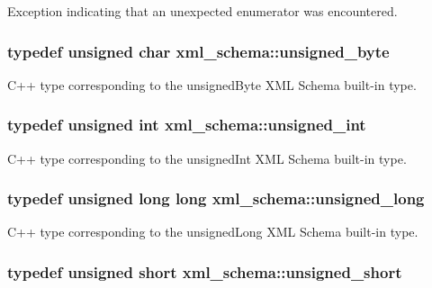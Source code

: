 Exception indicating that an unexpected enumerator was encountered. 

\hypertarget{namespacexml__schema_a876b68656d976c6343512f3d44fe8ca2}{
\subsubsection[{unsigned\-\_\-byte}]{\setlength{\rightskip}{0pt plus 5cm}typedef unsigned char {\bf xml\-\_\-schema\-::unsigned\-\_\-byte}}}\label{namespacexml__schema_a876b68656d976c6343512f3d44fe8ca2}


C++ type corresponding to the unsigned\-Byte X\-M\-L Schema built-\/in type. 

\hypertarget{namespacexml__schema_a85ca3205d8af287e149aac54535f57e7}{
\subsubsection[{unsigned\-\_\-int}]{\setlength{\rightskip}{0pt plus 5cm}typedef unsigned int {\bf xml\-\_\-schema\-::unsigned\-\_\-int}}}\label{namespacexml__schema_a85ca3205d8af287e149aac54535f57e7}


C++ type corresponding to the unsigned\-Int X\-M\-L Schema built-\/in type. 

\hypertarget{namespacexml__schema_a4413fbcf4c65ffc7aaafe465d72fcb33}{
\subsubsection[{unsigned\-\_\-long}]{\setlength{\rightskip}{0pt plus 5cm}typedef unsigned long long {\bf xml\-\_\-schema\-::unsigned\-\_\-long}}}\label{namespacexml__schema_a4413fbcf4c65ffc7aaafe465d72fcb33}


C++ type corresponding to the unsigned\-Long X\-M\-L Schema built-\/in type. 

\hypertarget{namespacexml__schema_a7fc7b4a846c512c370346e15dfdcecaa}{
\subsubsection[{unsigned\-\_\-short}]{\setlength{\rightskip}{0pt plus 5cm}typedef unsigned short {\bf xml\-\_\-schema\-::unsigned\-\_\-short}}}\label{namespacexml__schema_a7fc7b4a846c512c370346e15dfdcecaa}


